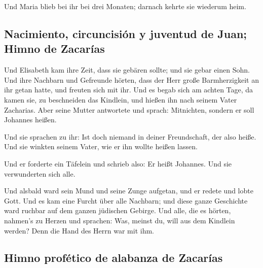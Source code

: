  Und Maria blieb bei ihr bei drei Monaten; darnach kehrte
sie wiederum heim.

\hypertarget{nacimiento-circuncisiuxf3n-y-juventud-de-juan-himno-de-zacaruxedas}{%
\subsection{Nacimiento, circuncisión y juventud de Juan; Himno de
Zacarías}\label{nacimiento-circuncisiuxf3n-y-juventud-de-juan-himno-de-zacaruxedas}}

 Und Elisabeth kam ihre Zeit, dass sie gebären sollte;
und sie gebar einen Sohn.  Und ihre Nachbarn und
Gefreunde hörten, dass der Herr große Barmherzigkeit an ihr getan hatte,
und freuten sich mit ihr.  Und es begab sich am achten
Tage, da kamen sie, zu beschneiden das Kindlein, und hießen ihn nach
seinem Vater Zacharias.  Aber seine Mutter antwortete und
sprach: Mitnichten, sondern er soll Johannes heißen.

 Und sie sprachen zu ihr: Ist doch niemand in deiner
Freundschaft, der also heiße.  Und sie winkten seinem
Vater, wie er ihn wollte heißen lassen.

 Und er forderte ein Täfelein und schrieb also: Er heißt
Johannes. Und sie verwunderten sich alle.

 Und alsbald ward sein Mund und seine Zunge aufgetan, und
er redete und lobte Gott.  Und es kam eine Furcht über
alle Nachbarn; und diese ganze Geschichte ward ruchbar auf dem ganzen
jüdischen Gebirge.  Und alle, die es hörten, nahmen's zu
Herzen und sprachen: Was, meinst du, will aus dem Kindlein werden? Denn
die Hand des Herrn war mit ihm.

\hypertarget{himno-profuxe9tico-de-alabanza-de-zacaruxedas}{%
\subsection{Himno profético de alabanza de
Zacarías}\label{himno-profuxe9tico-de-alabanza-de-zacaruxedas}}

